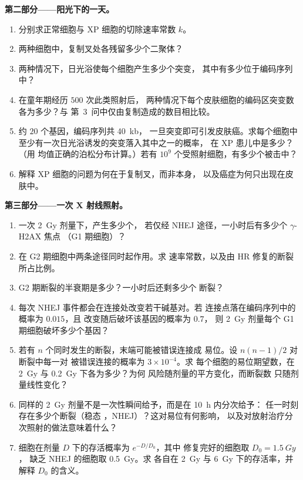 \begin{problem}
\medskip
\noindent\textbf{第二部分——阳光下的一天。}
\begin{enumerate}[resume]
  \item 分别求正常细胞与
        XP 细胞的切除速率常数 $k$。
  \item 两种细胞中，复制叉处各残留多少个二聚体？
  \item 两种情况下，日光浴使每个细胞产生多少个突变，
        其中有多少位于编码序列中？
  \item 在童年期经历 $500$ 次此类照射后，
        两种情况下每个皮肤细胞的编码区突变数各为多少？与
        第~3~问中仅由复制造成的数目相比较。
  \item 约 $20$ 个基因，编码序列共 \qty{40}{kb}，
        一旦突变即可引发皮肤癌。求每个细胞中
        至少有一次日光浴诱发的突变落入其中之一的概率，
        在 XP 患儿中是多少？（用
        均值正确的泊松分布计算。）若有 $10^{9}$ 个受照射细胞，有多少个被击中？
  \item 解释 XP 细胞的问题为何在于复制叉，而非本身，
        以及癌症为何只出现在皮肤中。
\end{enumerate}

\medskip
\noindent\textbf{第三部分——一次 X 射线照射。}
\begin{enumerate}[resume]
  \item 一次 \qty{2}{Gy} 剂量下，产生多少个，
        若仅经 NHEJ 途径，一小时后有多少个 $\gamma$-H2AX 焦点
        （G1 期细胞）？
  \item 在 G2 期细胞中两条途径同时起作用。求
        速率常数，以及由 HR 修复的断裂所占比例。
  \item G2 期断裂的半衰期是多少？一小时后还剩多少个
        断裂？
  \item 每次 NHEJ 事件都会在连接处改变若干碱基对。若
        连接点落在编码序列中的概率为 $0.015$，且
        改变随后破坏该基因的概率为 $0.7$，
        则 \qty{2}{Gy} 剂量每个 G1 期细胞破坏多少个基因？
  \item 若有 $n$ 个同时发生的断裂，末端可能被错误连接成
        易位。设 $n(n-1)/2$ 对断裂中每一对
        被错误连接的概率为 $3\times 10^{-4}$。求
        每个细胞的易位期望数，在 \qty{2}{Gy} 与 \qty{0.2}{Gy} 下各为多少？为何
        风险随剂量的平方变化，而断裂数
        只随剂量线性变化？
  \item 同样的 \qty{2}{Gy} 剂量不是一次性瞬间给予，而是在 \qty{10}{h} 内分次给予：
        任一时刻存在多少个断裂（稳态
        ，NHEJ）？这对易位有何影响，
        以及对放射治疗分次照射的做法意味着什么？
  \item 细胞在剂量 $D$ 下的存活概率为 $e^{-D/D_{0}}$，其中
        修复完好的细胞取 $D_{0} = \qty{1.5}{Gy}$，
        缺乏 NHEJ 的细胞取 \qty{0.5}{Gy}。求
        各自在 \qty{2}{Gy} 与 \qty{6}{Gy} 下的存活率，并解释 $D_{0}$ 的含义。
\end{enumerate}


\end{problem}
